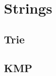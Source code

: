 \documentclass[../Notes/main.tex]{subfiles}
\begin{document}
\section{Strings}

\subsection{Trie}


\subsection{KMP}

\end{document}
